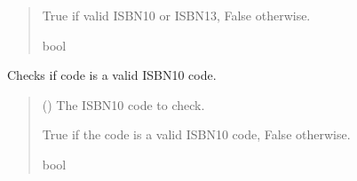 \documentclass[letterpaper,10pt,english]{sphinxmanual}
\begin{document}
\begin{fulllineitems}
\begin{fulllineitems}
\begin{quote}
\begin{description}
\sphinxAtStartPar
True if valid ISBN\sphinxhyphen{}10 or ISBN\sphinxhyphen{}13, False otherwise.

\sphinxAtStartPar
bool

\end{description}\end{quote}

\end{fulllineitems}


\begin{fulllineitems}
\label{\detokenize{apache_commons_validator_python.routines:apache_commons_validator_python.routines.isbn_validator.ISBNValidator.is_valid_isbn10}}
\pysigstartsignatures
{}
\pysigstopsignatures
\sphinxAtStartPar
Checks if code is a valid ISBN\sphinxhyphen{}10 code.
\begin{quote}\begin{description}
\sphinxAtStartPar
{} () \textendash{} The ISBN\sphinxhyphen{}10 code to check.

\sphinxAtStartPar
True if the code is a valid ISBN\sphinxhyphen{}10 code, False otherwise.

\sphinxAtStartPar
bool

\end{description}\end{quote}

\end{fulllineitems}



\end{fulllineitems}
\end{document}
